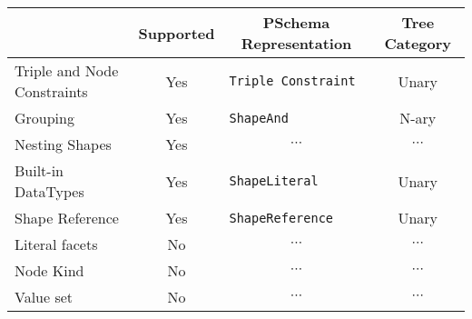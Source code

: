 \begin{table}[ht]
    \centering
    \begin{tabular}{|l|c|l|c|}
        \hline
        \rowcolor[HTML]{EFEFEF}
        \multicolumn{1}{|c|}{\cellcolor[HTML]{EFEFEF}\textbf{Feature}} & \textbf{Supported}         & \multicolumn{1}{c|}{\cellcolor[HTML]{EFEFEF}\textbf{PSchema Representation}} & \multicolumn{1}{c|}{\cellcolor[HTML]{EFEFEF}\textbf{Tree Category}} \\ \hline
        Triple and Node Constraints                                    & {\color[HTML]{009901} Yes} & \texttt{Triple Constraint}                                                   & Unary                                                               \\ \hline
        Grouping                                                       & {\color[HTML]{009901} Yes} & \texttt{ShapeAnd}                                                            & N-ary                                                               \\ \hline
        Nesting Shapes                                                 & {\color[HTML]{009901} Yes} & \multicolumn{1}{c|}{$\cdots$}                                                & \multicolumn{1}{c|}{$\cdots$}                                       \\ \hline
        Built-in DataTypes                                             & {\color[HTML]{009901} Yes} & \texttt{ShapeLiteral}                                                        & Unary                                                               \\ \hline
        Shape Reference                                                & {\color[HTML]{009901} Yes} & \texttt{ShapeReference}                                                      & Unary                                                               \\ \hline
        Literal facets                                                 & {\color[HTML]{FE0000} No}  & \multicolumn{1}{c|}{$\cdots$}                                                & \multicolumn{1}{c|}{$\cdots$}                                       \\ \hline
        Node Kind                                                      & {\color[HTML]{FE0000} No}  & \multicolumn{1}{c|}{$\cdots$}                                                & \multicolumn{1}{c|}{$\cdots$}                                       \\ \hline
        Value set                                                      & {\color[HTML]{FE0000} No}  & \multicolumn{1}{c|}{$\cdots$}                                                & \multicolumn{1}{c|}{$\cdots$}                                       \\ \hline

\end{tabular}
\end{table}
